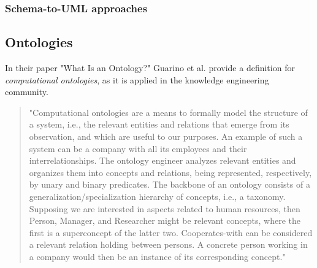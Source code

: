 \subsubsection{Schema-to-UML approaches}\label{subsubsec:schema-to-uml}

\subsection{Ontologies}
In their paper "What Is an Ontology?" Guarino et al.\cite{guarino2009ontology} provide a definition for \textit{computational ontologies}, as it is applied in the knowledge engineering community.
\begin{quote}
	"Computational ontologies are a means to formally model the structure of a system, i.e., the relevant entities and relations that emerge from its observation, and which are useful to our purposes. An example of such a system can be a company with all its employees and their interrelationships. The ontology engineer analyzes relevant entities and organizes them into concepts and relations, being represented, respectively, by unary and binary predicates. The backbone of an ontology consists of a generalization/specialization hierarchy of concepts, i.e., a taxonomy. Supposing we are interested in aspects related to human resources, then Person, Manager, and Researcher might be relevant concepts, where the first is a superconcept of the latter two. Cooperates-with can be considered a relevant relation holding between persons. A concrete person working in a company would then be an instance of its corresponding concept."\cite{guarino2009ontology}
\end{quote}


